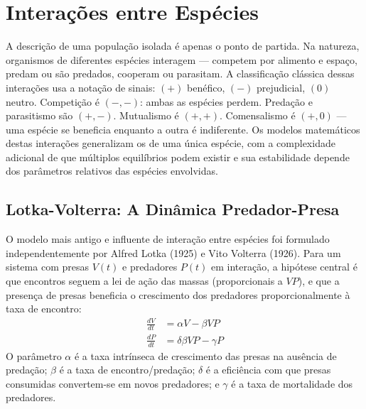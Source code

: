 \section{Interações entre Espécies}
\label{sec:10-interacoes}

A descrição de uma população isolada é apenas o ponto de partida. Na natureza,
organismos de diferentes espécies interagem --- competem por alimento e espaço,
predam ou são predados, cooperam ou parasitam. A classificação clássica
dessas interações usa a notação de sinais: $(+)$ benéfico, $(-)$ prejudicial,
$(0)$ neutro. Competição é $(-,-)$: ambas as espécies perdem. Predação e
parasitismo são $(+,-)$. Mutualismo é $(+,+)$. Comensalismo é $(+,0)$ ---
uma espécie se beneficia enquanto a outra é indiferente. Os modelos
matemáticos destas interações generalizam os de uma única espécie, com a
complexidade adicional de que múltiplos equilíbrios podem existir e sua
estabilidade depende dos parâmetros relativos das espécies envolvidas.

\subsection{Lotka-Volterra: A Dinâmica Predador-Presa}
\label{sub:image10-lotka-volterra}

O modelo mais antigo e influente de interação entre espécies foi formulado
independentemente por Alfred Lotka (1925) e Vito Volterra (1926). Para um
sistema com presas $V(t)$ e predadores $P(t)$ em interação, a hipótese central
é que encontros seguem a lei de ação das massas (proporcionais a $VP$), e que
a presença de presas beneficia o crescimento dos predadores proporcionalmente
à taxa de encontro:
\begin{align}
\frac{dV}{dt} &= \alpha V - \beta V P \\
\frac{dP}{dt} &= \delta \beta V P - \gamma P
\end{align}
O parâmetro $\alpha$ é a taxa intrínseca de crescimento das presas na ausência
de predação; $\beta$ é a taxa de encontro/predação; $\delta$ é a eficiência
com que presas consumidas convertem-se em novos predadores; e $\gamma$ é a
taxa de mortalidade dos predadores.

